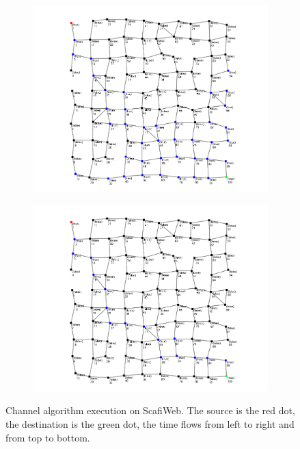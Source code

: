 \documentclass[12pt,a4paper,openright,twoside]{book}
\begin{document}
\begin{figure}[h!]
\begin{subfigure}[b]{0.49\textwidth}
        \includegraphics[width=\textwidth]{figures/channel3.png}
    \end{subfigure}
    \hfill
    \begin{subfigure}[b]{0.49\textwidth}
        \centering
        \includegraphics[width=\textwidth]{figures/channel4.png}
    \end{subfigure}
\caption{Channel algorithm execution on ScafiWeb. The source is the red dot, the destination is the green dot, 
    the time flows from left to right and from top to bottom.}
\label{fig:channel-scafiweb}
\end{figure}
\end{document}
